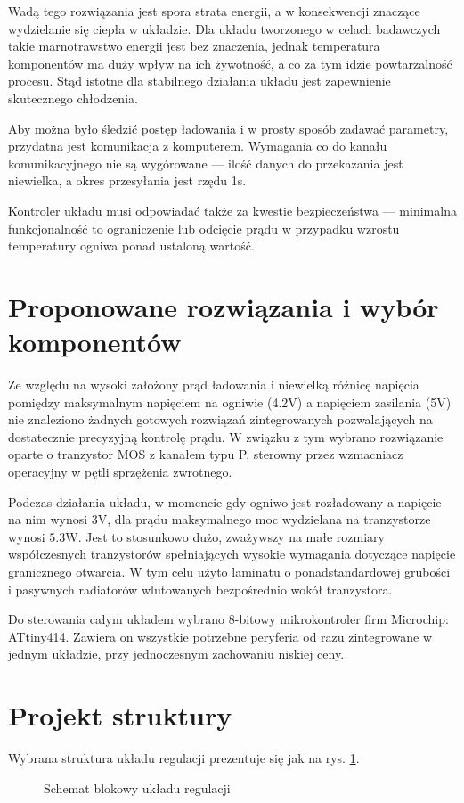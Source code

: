 \documentclass[polish,engineer]{polsl-msth}
\begin{document}
Wadą tego rozwiązania jest spora strata energii, a w konsekwencji znaczące wydzielanie się ciepła w układzie. Dla układu tworzonego w celach badawczych takie marnotrawstwo energii jest bez znaczenia, jednak temperatura komponentów ma duży wpływ na ich żywotność, a co za tym idzie powtarzalność procesu. Stąd istotne dla stabilnego działania układu jest zapewnienie skutecznego chłodzenia.

Aby można było śledzić postęp ładowania i w prosty sposób zadawać parametry, przydatna jest komunikacja z komputerem. Wymagania co do kanału komunikacyjnego nie są wygórowane --- ilość danych do przekazania jest niewielka, a okres przesyłania jest rzędu 1s.

Kontroler układu musi odpowiadać także za kwestie bezpieczeństwa --- minimalna funkcjonalność to ograniczenie lub odcięcie prądu w przypadku wzrostu temperatury ogniwa ponad ustaloną wartość.

\section{Proponowane rozwiązania i wybór komponentów}
Ze względu na wysoki założony prąd ładowania i niewielką różnicę napięcia pomiędzy maksymalnym napięciem na ogniwie (4.2V) a napięciem zasilania (5V) nie znaleziono żadnych gotowych rozwiązań zintegrowanych pozwalających na dostatecznie precyzyjną kontrolę prądu. W związku z tym wybrano rozwiązanie oparte o tranzystor MOS z kanałem typu P, sterowny przez wzmacniacz operacyjny w pętli sprzężenia zwrotnego.

Podczas działania układu, w momencie gdy ogniwo jest rozładowany a napięcie na nim wynosi 3V, dla prądu maksymalnego moc wydzielana na tranzystorze wynosi $5.3\mathrm{W}$. Jest to stosunkowo dużo, zważywszy na małe rozmiary współczesnych tranzystorów spełniających wysokie wymagania dotyczące napięcie granicznego otwarcia. W tym celu użyto laminatu o ponadstandardowej grubości i pasywnych radiatorów wlutowanych bezpośrednio wokół tranzystora.

Do sterowania całym układem wybrano 8-bitowy mikrokontroler firm Microchip: ATtiny414. Zawiera on wszystkie potrzebne peryferia od razu zintegrowane w jednym układzie, przy jednoczesnym zachowaniu niskiej ceny. 
\section{Projekt struktury}
Wybrana struktura układu regulacji prezentuje się jak na rys. \ref{dia:reg_all}. 
\begin{figure}
     \resizebox{\linewidth}{!}{}
     \caption{Schemat blokowy układu regulacji\label{dia:reg_all}}
\end{figure}
\end{document}
